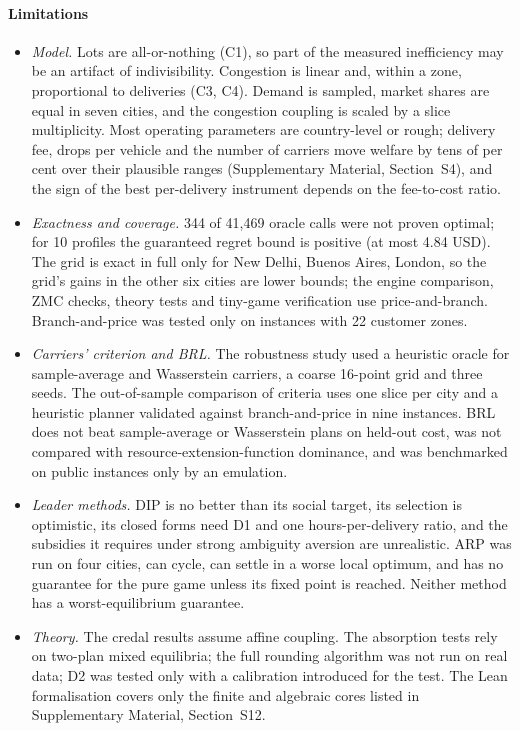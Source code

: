 \documentclass[preprint,11pt]{elsarticle}
\theoremstyle{definition}
\theoremstyle{remark}
\newcommand{\SM}[1]{Supplementary Material, Section~#1}
\begin{document}
\paragraph{Limitations}
\begin{itemize}[leftmargin=*,itemsep=0pt]
\item \emph{Model.} Lots are all-or-nothing (C1), so part of the measured inefficiency may be an artifact of indivisibility. Congestion is linear and, within a zone, proportional to deliveries (C3, C4). Demand is sampled, market shares are equal in seven cities, and the congestion coupling is scaled by a slice multiplicity. Most operating parameters are country-level or rough; delivery fee, drops per vehicle and the number of carriers move welfare by tens of per cent over their plausible ranges (\SM{S4}), and the sign of the best per-delivery instrument depends on the fee-to-cost ratio.
\item \emph{Exactness and coverage.} 344 of 41{,}469 oracle calls were not proven optimal; for 10 profiles the guaranteed regret bound is positive (at most 4.84 USD). The grid is exact in full only for New Delhi, Buenos Aires, London, so the grid's gains in the other six cities are lower bounds; the engine comparison, ZMC checks, theory tests and tiny-game verification use price-and-branch. Branch-and-price was tested only on instances with 22 customer zones.
\item \emph{Carriers' criterion and BRL.} The robustness study used a heuristic oracle for sample-average and Wasserstein carriers, a coarse 16-point grid and three seeds. The out-of-sample comparison of criteria uses one slice per city and a heuristic planner validated against branch-and-price in nine instances. BRL does not beat sample-average or Wasserstein plans on held-out cost, was not compared with resource-extension-function dominance, and was benchmarked on public instances only by an emulation.
\item \emph{Leader methods.} DIP is no better than its social target, its selection is optimistic, its closed forms need D1 and one hours-per-delivery ratio, and the subsidies it requires under strong ambiguity aversion are unrealistic. ARP was run on four cities, can cycle, can settle in a worse local optimum, and has no guarantee for the pure game unless its fixed point is reached. Neither method has a worst-equilibrium guarantee.
\item \emph{Theory.} The credal results assume affine coupling. The absorption tests rely on two-plan mixed equilibria; the full rounding algorithm was not run on real data; D2 was tested only with a calibration introduced for the test. The Lean formalisation covers only the finite and algebraic cores listed in \SM{S12}.

\end{itemize}
\end{document}
